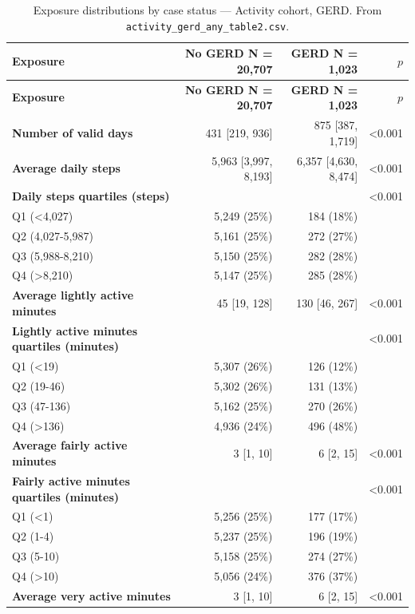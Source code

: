 \documentclass[11pt]{article}
\newcommand{\code}[1]{\texttt{\small #1}}
\begin{document}
\footnotesize\begin{longtable}{@{}p{6.4cm}rrr@{}}
\caption{Exposure distributions by case status --- Activity cohort, GERD. From \code{activity\_gerd\_any\_table2.csv}.}\label{tab:appM-t2-activity-gerd-any}\\
\toprule \textbf{Exposure} & \textbf{No GERD     N = 20,707} & \textbf{GERD     N = 1,023} & \textbf{$p$} \\ \midrule \endfirsthead
\toprule \textbf{Exposure} & \textbf{No GERD     N = 20,707} & \textbf{GERD     N = 1,023} & \textbf{$p$} \\ \midrule \endhead
\textbf{Number of valid days} & 431 [219, 936] & 875 [387, 1,719] & <0.001 \\
\textbf{Average daily steps} & 5,963 [3,997, 8,193] & 6,357 [4,630, 8,474] & <0.001 \\
\textbf{Daily steps quartiles (steps)} &  &  & <0.001 \\
\quad Q1 (<4,027) & 5,249 (25\%) & 184 (18\%) &  \\
\quad Q2 (4,027-5,987) & 5,161 (25\%) & 272 (27\%) &  \\
\quad Q3 (5,988-8,210) & 5,150 (25\%) & 282 (28\%) &  \\
\quad Q4 (>8,210) & 5,147 (25\%) & 285 (28\%) &  \\
\textbf{Average lightly active minutes} & 45 [19, 128] & 130 [46, 267] & <0.001 \\
\textbf{Lightly active minutes quartiles (minutes)} &  &  & <0.001 \\
\quad Q1 (<19) & 5,307 (26\%) & 126 (12\%) &  \\
\quad Q2 (19-46) & 5,302 (26\%) & 131 (13\%) &  \\
\quad Q3 (47-136) & 5,162 (25\%) & 270 (26\%) &  \\
\quad Q4 (>136) & 4,936 (24\%) & 496 (48\%) &  \\
\textbf{Average fairly active minutes} & 3 [1, 10] & 6 [2, 15] & <0.001 \\
\textbf{Fairly active minutes quartiles (minutes)} &  &  & <0.001 \\
\quad Q1 (<1) & 5,256 (25\%) & 177 (17\%) &  \\
\quad Q2 (1-4) & 5,237 (25\%) & 196 (19\%) &  \\
\quad Q3 (5-10) & 5,158 (25\%) & 274 (27\%) &  \\
\quad Q4 (>10) & 5,056 (24\%) & 376 (37\%) &  \\
\textbf{Average very active minutes} & 3 [1, 10] & 6 [2, 15] & <0.001 \\

\end{longtable}
\end{document}
